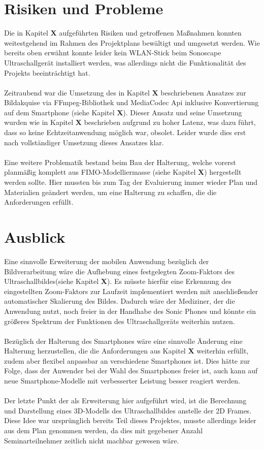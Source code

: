 \section{Risiken und Probleme}
Die in Kapitel \textbf{X} aufgeführten Risiken und getroffenen Maßnahmen konnten weitestgehend im Rahmen des Projektplans bewältigt und umgesetzt werden. Wie bereits oben erwähnt konnte leider kein WLAN-Stick beim Sonoscape Ultraschallgerät installiert werden, was allerdings nicht die Funktionalität des Projekts beeinträchtigt hat.
\\
\\
Zeitraubend war die Umsetzung des in Kapitel \textbf{X} beschriebenen Ansatzes zur Bildakquise via FFmpeg-Bibliothek und MediaCodec Api inklusive Konvertierung auf dem Smartphone (siehe Kapitel \textbf{X}). Dieser Ansatz und seine Umsetzung wurden wie in Kapitel \textbf{X} beschrieben aufgrund zu hoher Latenz, was dazu führt, dass so keine Echtzeitanwendung möglich war, obsolet. Leider wurde dies erst nach vollständiger Umsetzung dieses Ansatzes klar. 
\\
\\
Eine weitere Problematik bestand beim Bau der Halterung, welche vorerst planmäßig komplett aus FIMO-Modelliermasse (siehe Kapitel \textbf{X}) hergestellt werden sollte. Hier mussten bis zum Tag der Evaluierung immer wieder Plan und Materialien geändert werden, um eine Halterung zu schaffen, die die Anforderungen erfüllt.

\section{Ausblick}
Eine sinnvolle Erweiterung der mobilen Anwendung bezüglich der Bildverarbeitung wäre die Aufhebung eines festgelegten Zoom-Faktors des Ultraschallbildes(siehe Kapitel \textbf{X}). Es müsste hierfür eine Erkennung des eingestellten Zoom-Faktors zur Laufzeit implementiert werden mit anschließender automatischer Skalierung des Bildes. Dadurch wäre der Mediziner, der die Anwendung nutzt, noch freier in der Handhabe des Sonic Phones und könnte ein größeres Spektrum der Funktionen des Ultraschallgeräts weiterhin nutzen.
\\
\\
Bezüglich der Halterung des Smartphones wäre eine sinnvolle Änderung eine Halterung herzustellen, die die Anforderungen aus Kapitel \textbf{X} weiterhin erfüllt, zudem aber flexibel anpassbar an verschiedene Smartphones ist. Dies hätte zur Folge, dass der Anwender bei der Wahl des Smartphones freier ist, auch kann auf neue Smartphone-Modelle mit verbesserter Leistung besser reagiert werden.
\\
\\
Der letzte Punkt der als Erweiterung hier aufgeführt wird, ist die Berechnung und Darstellung eines 3D-Modells des Ultraschallbildes anstelle der 2D Frames. Diese Idee war ursprünglich bereits Teil dieses Projektes, musste allerdings leider aus dem Plan genommen werden, da dies mit gegebener Anzahl Seminarteilnehmer zeitlich nicht machbar gewesen wäre.

